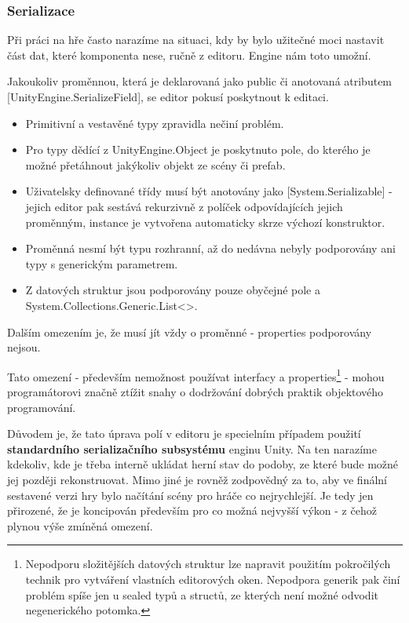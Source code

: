 \subsubsection*{Serializace} \label{gameObjectSerializationSubSubSection}

Při práci na hře často narazíme na situaci, kdy by bylo užitečné moci nastavit část dat, které komponenta nese, ručně z editoru. Engine nám toto umožní.

Jakoukoliv proměnnou, která je deklarovaná jako public či anotovaná atributem [UnityEngine.SerializeField], se editor pokusí poskytnout k editaci.
\begin{itemize}
    \item Primitivní a vestavěné typy zpravidla nečiní problém.
    \item Pro typy dědící z UnityEngine.Object je poskytnuto pole, do kterého je možné přetáhnout jakýkoliv objekt ze scény či prefab.
    \item Uživatelsky definované třídy musí být anotovány jako [System.Serializable] - jejich editor pak sestává rekurzivně z políček odpovídajících jejich proměnným, instance je vytvořena automaticky skrze výchozí konstruktor.
    \item Proměnná nesmí být typu rozhranní, až do nedávna nebyly podporovány ani typy s generickým parametrem.
    \item Z datových struktur jsou podporovány pouze obyčejné pole a System.Collections.Generic.List<>.
\end{itemize}
Dalším omezením je, že musí jít vždy o proměnné - properties podporovány nejsou.

Tato omezení - především nemožnost používat interfacy a properties\footnote{Nepodporu složitějších datových struktur lze napravit použitím pokročilých technik pro vytváření vlastních editorových oken. Nepodpora generik pak činí problém spíše jen u sealed typů a structů, ze kterých není možné odvodit negenerického potomka.} - mohou programátorovi značně ztížit snahy o dodržování dobrých praktik objektového programování.

Důvodem je, že tato úprava polí v editoru je specielním případem použití \textbf{standardního serializačního subsystému} enginu Unity. Na ten narazíme kdekoliv, kde je třeba interně ukládat herní stav do podoby, ze které bude možné jej později rekonstruovat. Mimo jiné je rovněž zodpovědný za to, aby ve finální sestavené verzi hry bylo načítání scény pro hráče co nejrychlejší. Je tedy jen přirozené, že je koncipován především pro co možná nejvyšší výkon - z čehož plynou výše zmíněná omezení.

